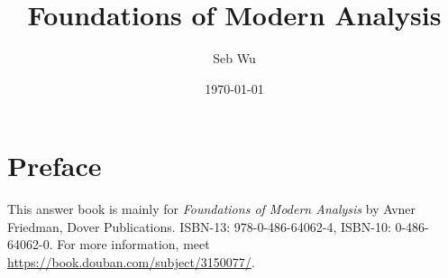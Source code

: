 \documentclass[UTF8]{book}
\title{\bf Foundations of Modern Analysis}
\author{Seb Wu}
\date{\today}
\begin{document}
\frontmatter
	\fancyhead{}
	\fancyhead[OR,EL]{\thepage}
	\fancyhead[OL,ER]{}
	\fancyfoot{}
\maketitle
\chapter{Preface}
	This answer book is mainly for \emph{Foundations of Modern Analysis} by Avner Friedman, Dover Publications. ISBN-13:  978-0-486-64062-4, ISBN-10: 0-486-64062-0. For more information, meet \url{https://book.douban.com/subject/3150077/}.
\cleardoublepage
{}
\tableofcontents
\fancyhead[C]{\leftmark}

\mainmatter
	\fancyhead{}
	\fancyhead[OR,EL]{\thepage}
	\fancyhead[C]{\leftmark}
	\fancyfoot{}




\end{document}
